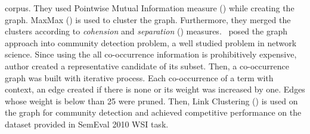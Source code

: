 corpus. They used Pointwise Mutual Information measure (\cite{bouma2009pointwise}) while creating the graph. MaxMax (\cite{hope2013maxmax}) is used to cluster the graph. Furthermore, they merged the clusters according to \emph{cohension} and \emph{separation} (\cite{pang2006introduction}) measures. \ posed the graph approach into community detection problem, a well studied problem in network science. Since using the all co-occurrence information is prohibitively expensive, author created a representative candidate of its subset. Then, a co-occurrence graph was built with iterative process. Each co-occurrence of a term with context, an edge created if there is none or its weight was increased by one. Edges whose weight is below than 25 were pruned. Then, Link Clustering (\cite{ahn10link}) is used on the graph for community detection and achieved competitive performance on the dataset provided in SemEval 2010 WSI task. \\

